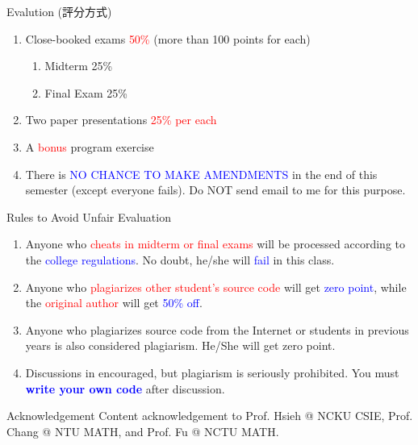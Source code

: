 \documentclass[aspectratio=169, 14pt, UTF8, t]{beamer}
\let\olditem\item
\renewcommand\item{\olditem\justifying}
\begin{document}
\begin{frame}{Evalution (評分方式)}
  \begin{enumerate}
    \item Close-booked exams \textcolor{red}{50\%} (more than 100 points for each)
      \begin{enumerate}
        \item Midterm 25\%
        \item Final Exam 25\%
      \end{enumerate}
    \item Two paper presentations \textcolor{red}{25\% per each}
    \item A \textcolor{red}{bonus} program exercise
    \item There is \textcolor{blue}{NO CHANCE TO MAKE AMENDMENTS} in the end of this semester (except everyone fails). Do NOT send email to me for this purpose.
  \end{enumerate}
\end{frame}

\begin{frame}{Rules to Avoid Unfair Evaluation}
  \begin{enumerate}
    \item Anyone who \textcolor{red}{cheats in midterm or final exams} will be processed according to the \textcolor{blue}{college regulations}. No doubt, he/she will \textcolor{blue}{fail} in this class.
    \item Anyone who \textcolor{red}{plagiarizes other student's source code} will get \textcolor{blue}{zero point}, while the \textcolor{red}{original author} will get \textcolor{blue}{50\% off}.
    \item Anyone who plagiarizes source code from the Internet or students in previous years is also considered plagiarism. He/She will get zero point.
    \item Discussions in encouraged, but plagiarism is seriously prohibited. You must \textcolor{blue}{\textbf{write your own code}} after discussion.
  \end{enumerate}
\end{frame}

\begin{frame}{Acknowledgement}
  Content acknowledgement to Prof. Hsieh @ NCKU CSIE, Prof. Chang @ NTU MATH, and Prof. Fu @ NCTU MATH.
\end{frame}
\end{document}

